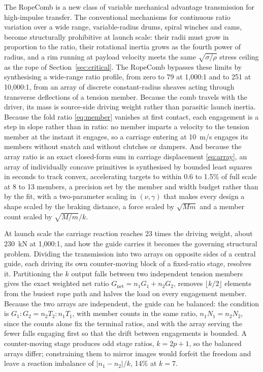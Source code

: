 \documentclass[preprint,12pt,number]{elsarticle}
\newcommand{\Gnet}{G_{\mathrm{net}}}
\begin{document}
The RopeComb is a new class of variable mechanical advantage transmission for high-impulse transfer. The conventional mechanisms for continuous ratio variation over a wide range, variable-radius drums, spiral winches and cams, become structurally prohibitive at launch scale: their radii must grow in proportion to the ratio, their rotational inertia grows as the fourth power of radius, and a rim running at payload velocity meets the same $\sqrt{\sigma/\rho}$ stress ceiling as the rope of Section~\ref{sec:critical}. The RopeComb bypasses these limits by synthesising a wide-range ratio profile, from zero to 79 at 1,000:1 and to 251 at 10,000:1, from an array of discrete constant-radius sheaves acting through transverse deflections of a tension member. Because the comb travels with the driver, its mass is source-side driving weight rather than parasitic launch inertia. Because the fold ratio \eqref{eq:member} vanishes at first contact, each engagement is a step in slope rather than in ratio: no member imparts a velocity to the tension member at the instant it engages, so a carriage entering at 10~m/s engages its members without snatch and without clutches or dampers. And because the array ratio is an exact closed-form sum in carriage displacement \eqref{eq:array}, an array of individually concave primitives is synthesised by bounded least squares in seconds to track convex, accelerating targets to within 0.6 to 1.5\% of full scale at 8 to 13 members, a precision set by the member and width budget rather than by the fit, with a two-parameter scaling in $(\nu, \gamma)$ that makes every design a shape scaled by the braking distance, a force scaled by $\sqrt{Mm}$ and a member count scaled by $\sqrt{M/m}/k$.

At launch scale the carriage reaction reaches 23 times the driving weight, about 230~kN at 1,000:1, and how the guide carries it becomes the governing structural problem. Dividing the transmission into two arrays on opposite sides of a central guide, each driving its own counter-moving block of a fixed-ratio stage, resolves it. Partitioning the $k$ output falls between two independent tension members gives the exact weighted net ratio $\Gnet = n_1 G_1 + n_2 G_2$, removes $\lfloor k/2 \rfloor$ elements from the busiest rope path and halves the load on every engagement member. Because the two arrays are independent, the guide can be balanced: the condition is $G_1 : G_2 = n_2 T_2 : n_1 T_1$, with member counts in the same ratio, $n_1 N_1 = n_2 N_2$, since the counts alone fix the terminal ratios, and with the array serving the fewer falls engaging first so that the drift between engagements is bounded. A counter-moving stage produces odd stage ratios, $k = 2p+1$, so the balanced arrays differ; constraining them to mirror images would forfeit the freedom and leave a reaction imbalance of $|n_1 - n_2|/k$, 14\% at $k=7$.
\end{document}
